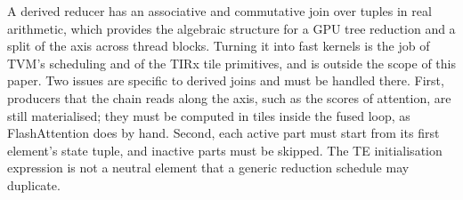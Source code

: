 \ifsubmit\else
{}
\fi
A derived reducer has an associative and commutative join over tuples in real arithmetic, which provides the algebraic structure for a GPU tree reduction and a split of the axis across thread blocks.
Turning it into fast kernels is the job of TVM's scheduling and of the TIRx tile primitives, and is outside the scope of this paper.
Two issues are specific to derived joins and must be handled there.
First, producers that the chain reads along the axis, such as the scores of attention, are still materialised; they must be computed in tiles inside the fused loop, as FlashAttention does by hand.
Second, each active part must start from its first element's state tuple, and inactive parts must be skipped. The TE initialisation expression is not a neutral element that a generic reduction schedule may duplicate.
